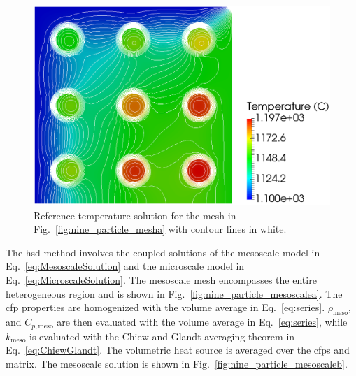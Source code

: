 \begin{figure}[!h]
  \centering
  \hspace{3.2cm}
  \includegraphics[width=0.63\linewidth]{figs/compact_9_reference.png}
\caption{Reference temperature solution for the mesh in Fig.\ \ref{fig:nine_particle_mesha} with contour lines in white.}
\label{fig:nine_particle_mesh}
\end{figure}

The \gls{hsd} method involves the coupled solutions of the mesoscale model in Eq.\ \eqref{eq:MesoscaleSolution} and the microscale model in Eq.\ \eqref{eq:MicroscaleSolution}. The mesoscale mesh encompasses the entire heterogeneous region and is shown in Fig.\ \ref{fig:nine_particle_mesoscalea}. The \gls{cfp} properties are homogenized with the volume average in Eq.\ \eqref{eq:series}. \(\rho_\text{meso}\), and \(C_{p,\text{meso}}\) are then evaluated with the volume average in Eq.\ \eqref{eq:series}, while \(k_\text{meso}\) is evaluated with the Chiew and Glandt averaging theorem in Eq.\ \eqref{eq:ChiewGlandt}. The volumetric heat source is averaged over the \glspl{cfp} and matrix. The mesoscale solution is shown in Fig.\ \ref{fig:nine_particle_mesoscaleb}. 

